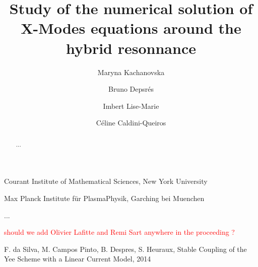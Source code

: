 \documentclass[proc]{edpsmath}
\begin{document}
\title{Study of the
	numerical solution of X-Modes equations around the hybrid resonnance} %
%
\author{Maryna Kachanovska}\address{UMA, ENSTA, Paris}
\author{Bruno Depsr\'es}\address{Laboratoire Jacques-Louis Lions, University PARIS 6}
\author{Imbert Lise-Marie}{Courant Institute of Mathematical Sciences, New York University}
\author{C\'eline Caldini-Queiros}{Max Planck Institute für PlasmaPhysik, Garching bei Muenchen}


%
%
\begin{abstract} ... \end{abstract}
%
\begin{resume} ... \end{resume}
%
%
\maketitle
\textcolor{red}{should we add Olivier Lafitte and Remi Sart anywhere in the proceeding ?}\\

%





\begin{thebibliography}{99}
 F. da Silva, M. Campos Pinto, B. Despres, S. Heuraux, Stable Coupling of the Yee Scheme with a Linear Current Model,
2014
\end{thebibliography}
\end{document}
